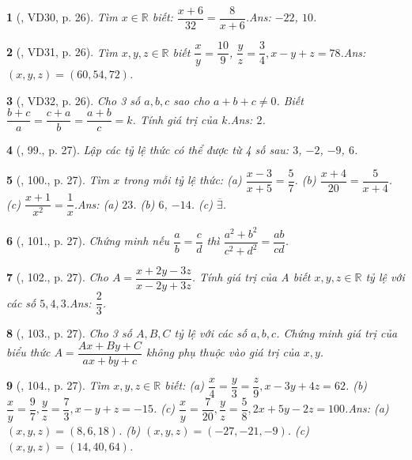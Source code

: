 \documentclass{article}
\newtheorem{baitoan}{}
\begin{document}
\begin{baitoan}[\cite{Tuyen_Toan_7}, VD30, p. 26]
	Tìm $x\in\mathbb{R}$ biết: $\dfrac{x + 6}{32} = \dfrac{8}{x + 6}$.\hfill{\sf Ans:} $-22$, $10$.
\end{baitoan}

\begin{baitoan}[\cite{Tuyen_Toan_7}, VD31, p. 26]
	Tìm $x,y,z\in\mathbb{R}$ biết $\dfrac{x}{y} = \dfrac{10}{9}$, $\dfrac{y}{z} = \dfrac{3}{4},x - y + z = 78$.\hfill{\sf Ans:} $(x,y,z) = (60,54,72)$.
\end{baitoan}

\begin{baitoan}[\cite{Tuyen_Toan_7}, VD32, p. 26]
	Cho 3 số $a,b,c$ sao cho $a + b + c\ne 0$. Biết $\dfrac{b + c}{a} = \dfrac{c + a}{b} = \dfrac{a + b}{c} = k$. Tính giá trị của $k$.\hfill{\sf Ans:} $2$.
\end{baitoan}

\begin{baitoan}[\cite{Tuyen_Toan_7}, 99., p. 27]
	Lập các tỷ lệ thức có thể được từ 4 số sau: $3$, $-2$, $-9$, $6$.
\end{baitoan}

\begin{baitoan}[\cite{Tuyen_Toan_7}, 100., p. 27]
	Tìm $x$ trong mỗi tỷ lệ thức: (a) $\dfrac{x - 3}{x + 5} = \dfrac{5}{7}$. (b) $\dfrac{x + 4}{20} = \dfrac{5}{x + 4}$. (c) $\dfrac{x + 1}{x^2} = \dfrac{1}{x}$.\hfill{\sf Ans:} (a) $23$. (b) $6$, $-14$. (c) $\overline{\exists}$.
\end{baitoan}

\begin{baitoan}[\cite{Tuyen_Toan_7}, 101., p. 27]
	Chứng minh nếu $\dfrac{a}{b} = \dfrac{c}{d}$ thì $\dfrac{a^2 + b^2}{c^2 + d^2} = \dfrac{ab}{cd}$.
\end{baitoan}

\begin{baitoan}[\cite{Tuyen_Toan_7}, 102., p. 27]
	Cho $A = \dfrac{x + 2y - 3z}{x - 2y + 3z}$. Tính giá trị của A biết $x,y,z\in\mathbb{R}$ tỷ lệ với các số $5,4,3$.\hfill{\sf Ans:} $\dfrac{2}{3}$.
\end{baitoan}

\begin{baitoan}[\cite{Tuyen_Toan_7}, 103., p. 27]
	Cho 3 số $A,B,C$ tỷ lệ với các số $a,b,c$. Chứng minh giá trị của biểu thức $A = \dfrac{Ax + By + C}{ax + by + c}$ không phụ thuộc vào giá trị của $x,y$.
\end{baitoan}

\begin{baitoan}[\cite{Tuyen_Toan_7}, 104., p. 27]
	Tìm $x,y,z\in\mathbb{R}$ biết: (a) $\dfrac{x}{4} = \dfrac{y}{3} = \dfrac{z}{9},x - 3y + 4z = 62$. (b) $\dfrac{x}{y} = \dfrac{9}{7},\dfrac{y}{z} = \dfrac{7}{3},x - y + z = -15$. (c) $\dfrac{x}{y} = \dfrac{7}{20},\dfrac{y}{z} = \dfrac{5}{8},2x + 5y - 2z = 100$.\hfill{\sf Ans:} (a) $(x,y,z) = (8,6,18)$. (b) $(x,y,z) = (-27,-21,-9)$. (c) $(x,y,z) = (14,40,64)$.
\end{baitoan}
\end{document}
